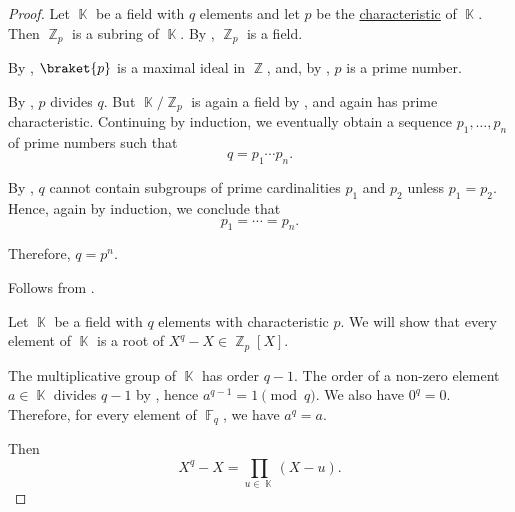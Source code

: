 \begin{proof}
   Let \( \BbbK \) be a field with \( q \) elements and let \( p \) be the \hyperref[def:ring_characteristic]{characteristic} of \( \BbbK \). Then \( \BbbZ_p \) is a subring of \( \BbbK \). By , \( \BbbZ_p \) is a field.

  By , \( \braket{ p } \) is a maximal ideal in \( \BbbZ \), and, by , \( p \) is a prime number.

  By , \( p \) divides \( q \). But \( \BbbK / \BbbZ_p \) is again a field by , and again has prime characteristic. Continuing by induction, we eventually obtain a sequence \( p_1, \ldots, p_n \) of prime numbers such that
  \begin{equation*}
    q = p_1 \cdots p_n.
  \end{equation*}

  By , \( q \) cannot contain subgroups of prime cardinalities \( p_1 \) and \( p_2 \) unless \( p_1 = p_2 \). Hence, again by induction, we conclude that
  \begin{equation*}
    p_1 = \cdots = p_n.
  \end{equation*}

  Therefore, \( q = p^n \).

   Follows from .

   Let \( \BbbK \) be a field with \( q \) elements with characteristic \( p \). We will show that every element of \( \BbbK \) is a root of \( X^q - X \in \BbbZ_p[X] \).

  The multiplicative group of \( \BbbK \) has order \( q - 1 \). The order of a non-zero element \( a \in \BbbK \) divides \( q - 1 \) by , hence \( a^{q - 1} = 1 \pmod q \). We also have \( 0^q = 0 \). Therefore, for every element of \( \BbbF_q \), we have \( a^q = a \).

  Then
  \begin{equation*}
    X^q - X = \prod_{u \in \BbbK} (X - u).
  \end{equation*}
\end{proof}

